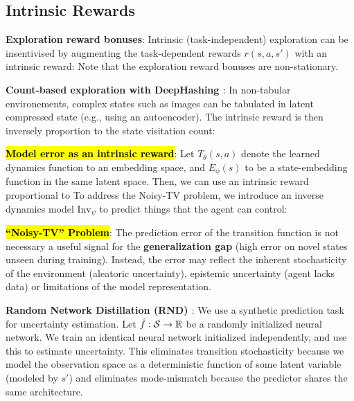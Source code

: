 \documentclass{article}
\begin{document}
\subsection{Intrinsic Rewards}

  \textbf{Exploration reward bonuses}: Intrinsic (task-independent) exploration can be insentivised by augmenting the task-dependent rewards $r(s,a,s')$ with an intrinsic reward:
  Note that the exploration reward bonuses are non-stationary.

  \textbf{Count-based exploration with DeepHashing \cite{tang2017exploration}}: In non-tabular environements, complex states such as images can be tabulated in latent compressed state (e.g., using an autoencoder). The intrinsic reward is then inversely proportion to the state visitation count:

  \textbf{\hl{Model error as an intrinsic reward}}: Let $T_\theta(s,a)$ denote the learned dynamics function to an embedding space, and $E_\phi(s)$ to be a state-embedding function in the same latent space. Then, we can use an intrinsic reward proportional to
  To address the Noisy-TV problem, we introduce an inverse dynamics model $\text{Inv}_\psi$ to predict things that the agent can control:

  \textbf{\hl{``Noisy-TV'' Problem}}: The prediction error of the transition function is not necessary a useful signal for the \textbf{generalization gap} (high error on novel states unseen during training). Instead, the error may reflect the inherent stochasticity of the environment (aleatoric uncertainty), epistemic uncertainty (agent lacks data) or limitations of the model representation.

  \textbf{Random Network Distillation (RND) \cite{burda2019exploration}}: We use a synthetic prediction task for uncertainty estimation. Let $\hat{f}: \mathcal{S}\to\mathbb{R}$ be a randomly initialized neural network. We train an identical neural network initialized independently, and use this to estimate uncertainty. This eliminates transition stochasticity because we model the observation space as a deterministic function of some latent variable (modeled by $s'$) and eliminates mode-mismatch because the predictor shares the same architecture.
\end{document}
